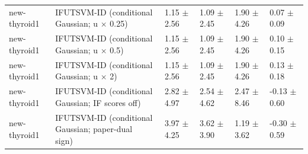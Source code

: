 \begin{table}[!t]
{\begin{tabular}{llllll}
new-thyroid1 & \shortstack[l]{IFUTSVM-ID (conditional\\Gaussian; u \(\times\) 0.25)} & 1.15 \(\pm\) 2.56 & 1.09 \(\pm\) 2.45 & 1.90 \(\pm\) 4.26 & 0.07 \(\pm\) 0.09 \\
new-thyroid1 & \shortstack[l]{IFUTSVM-ID (conditional\\Gaussian; u \(\times\) 0.5)} & 1.15 \(\pm\) 2.56 & 1.09 \(\pm\) 2.45 & 1.90 \(\pm\) 4.26 & 0.10 \(\pm\) 0.15 \\
new-thyroid1 & \shortstack[l]{IFUTSVM-ID (conditional\\Gaussian; u \(\times\) 2)} & 1.15 \(\pm\) 2.56 & 1.09 \(\pm\) 2.45 & 1.90 \(\pm\) 4.26 & 0.13 \(\pm\) 0.18 \\
new-thyroid1 & \shortstack[l]{IFUTSVM-ID (conditional\\Gaussian; IF scores off)} & 2.82 \(\pm\) 4.97 & 2.54 \(\pm\) 4.62 & 2.47 \(\pm\) 8.46 & -0.13 \(\pm\) 0.60 \\
new-thyroid1 & \shortstack[l]{IFUTSVM-ID (conditional\\Gaussian; paper-dual\\sign)} & 3.97 \(\pm\) 4.25 & 3.62 \(\pm\) 3.90 & 1.19 \(\pm\) 3.62 & -0.30 \(\pm\) 0.59 \\
\hline
\end{tabular}%
}
\end{table}

